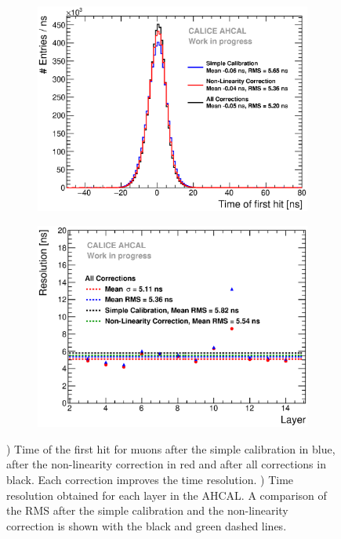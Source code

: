 \begin{figure}[htbp!]
	\begin{subfigure}[t]{0.49\textwidth}
		\centering
		\includegraphics[width=1\textwidth]{../Thesis_Plots/Timing/Muons/Plots/Timing_AHCAL_AllCorrection.eps}
		\caption{}\label{fig:timing_muons}
	\end{subfigure}
	\hfill
	\begin{subfigure}[t]{0.49\textwidth}
		\centering
		\includegraphics[width=1\textwidth]{../Thesis_Plots/Timing/Muons/Plots/ResolutionPerModule_AllCorrection.eps}
		\caption{}\label{fig:timing_reso_all_muons}
	\end{subfigure}
	\caption{) Time of the first hit for muons after the simple calibration in blue, after the non-linearity correction in red and after all corrections in black. Each correction improves the time resolution. ) Time resolution obtained for each layer in the AHCAL. A comparison of the RMS after the simple calibration and the non-linearity correction is shown with the black and green dashed lines.}
\end{figure}

